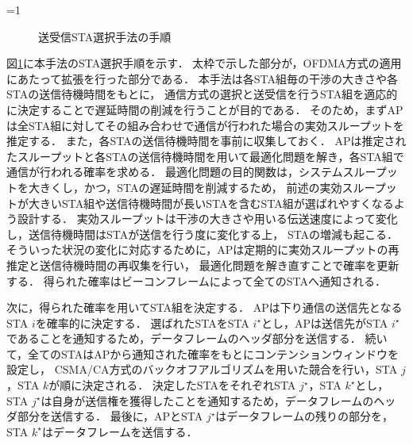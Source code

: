 \documentclass[technicalreport]{ieicej}
\newcounter{flagFig}
\newcommand{\sij}{(i,j)}
\def\equiv{\mathrel{\mathop:}=}
\newcommand{\sijk}{(i,j,k)}
\newcommand{\rijk}{r^{(i,j,k)}}
\begin{document}
			\ifnum\value{flagFig}=1 {\begin{figure}[t]
				\centering
				\caption{送受信STA選択手法の手順}
				\label{fig:process}
			\end{figure}}\fi
			図\ref{fig:process}に本手法のSTA選択手順を示す．
			太枠で示した部分が，OFDMA方式の適用にあたって拡張を行った部分である．
			本手法は各STA組毎の干渉の大きさや各STAの送信待機時間をもとに，
			通信方式の選択と送受信を行うSTA組を適応的に決定することで遅延時間の削減を行うことが目的である．
			そのため，まずAPは全STA組に対してその組み合わせで通信が行われた場合の実効スループットを推定する．
			また，各STAの送信待機時間を事前に収集しておく．
			APは推定されたスループットと各STAの送信待機時間を用いて最適化問題を解き，各STA組で通信が行われる確率を求める．
			最適化問題の目的関数は，システムスループットを大きくし，かつ，STAの遅延時間を削減するため，
			前述の実効スループットが大きいSTA組や送信待機時間が長いSTAを含むSTA組が選ばれやすくなるよう設計する．
			実効スループットは干渉の大きさや用いる伝送速度によって変化し，送信待機時間はSTAが送信を行う度に変化する上，
			STAの増減も起こる．
			そういった状況の変化に対応するために，APは定期的に実効スループットの再推定と送信待機時間の再収集を行い，
			最適化問題を解き直すことで確率を更新する．
			得られた確率はビーコンフレームによって全てのSTAへ通知される．
			\par
			次に，得られた確率を用いてSTA組を決定する．
			APは下り通信の送信先となるSTA $i$を確率的に決定する．
			選ばれたSTAをSTA $i^{\star}$とし，APは送信先がSTA $i^{\star}$であることを通知するため，データフレームのヘッダ部分を送信する．
			続いて，全てのSTAはAPから通知された確率をもとにコンテンションウィンドウを設定し，
			CSMA/CA方式のバックオフアルゴリズムを用いた競合を行い，STA $j$，STA $k$が順に決定される．
			決定したSTAをそれぞれSTA $j^{\star}$，STA $k^{\star}$とし，
			STA $j^{\star}$は自身が送信権を獲得したことを通知するため，データフレームのヘッダ部分を送信する．
			最後に，APとSTA $j^{\star}$はデータフレームの残りの部分を，STA $k^{\star}$はデータフレームを送信する．
\end{document}
